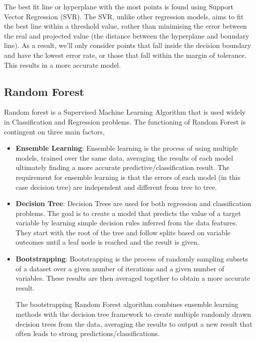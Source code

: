 \documentclass[conference]{IEEEtran}
\begin{document}
The best fit line or hyperplane with the most points is found using Support Vector Regression (SVR). The SVR, unlike other regression models, aims to fit the best line within a threshold value, rather than minimising the error between the real and projected value (the distance between the hyperplane and boundary line). As a result, we'll only consider points that fall inside the decision boundary and have the lowest error rate, or those that fall within the margin of tolerance. This results in a more accurate model.


\subsection{Random Forest}

Random forest is a Supervised Machine Learning Algorithm that is used widely in Classification and Regression problems. The functioning of Random Forest is contingent on three main factors, 

\begin{itemize}
\item \textbf{Ensemble Learning}: Ensemble learning is the process of using multiple models, trained over the same data, averaging the results of each model ultimately finding a more accurate predictive/classification result. The requirement for ensemble learning is that the errors of each model (in this case decision tree) are independent and different from tree to tree.

\item  \textbf{Decision Tree}: Decision Trees are used for both regression and classification problems. The goal is to create a model that predicts the value of a target variable by learning simple decision rules inferred from the data features. They start with the root of the tree and follow splits based on variable outcomes until a leaf node is reached and the result is given. 

\item \textbf{Bootstrapping}: Bootstrapping is the process of randomly sampling subsets of a dataset over a given number of iterations and a given number of variables. These results are then averaged together to obtain a more accurate result. 

The bootstrapping Random Forest algorithm \cite{B} combines ensemble learning methods with the decision tree framework to create multiple randomly drawn decision trees from the data, averaging the results to output a new result that often leads to strong predictions/classifications.

\end{itemize}
\end{document}
